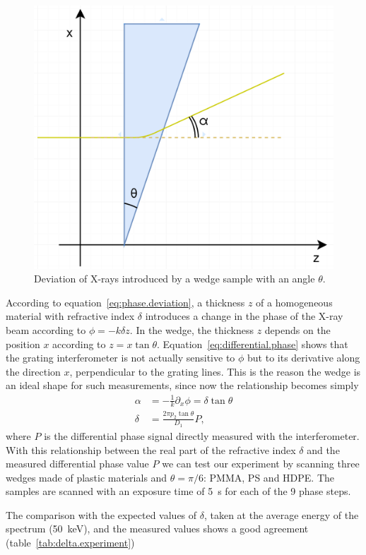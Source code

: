 \begin{figure}[htb]
    \centering
    \includegraphics[width=.5\textwidth]{gfx/wedge-deviation.png}
    \caption{Deviation of X-rays introduced by a wedge sample with an angle
    $\theta$.}
    \label{fig:wedge.deviation}
\end{figure}

According to equation~\eqref{eq:phase.deviation}, a thickness $z$ of a
homogeneous material with refractive index $\delta$ introduces a change in
the phase of the X-ray beam according to $\phi = -k\delta z$. In the wedge,
the thickness $z$ depends on the position $x$ according to $z = x\tan
\theta$. Equation~\eqref{eq:differential.phase} shows that the grating
interferometer is not actually sensitive to $\phi$ but to its derivative
along the direction $x$, perpendicular to the grating lines. This is the
reason the wedge is an ideal shape for such measurements, since now the
relationship becomes simply
\begin{align}
    \alpha &= -\frac{1}{k}\partial_x\phi = \delta\tan\theta\\
    \delta &= \frac{2 \pi p_2 \tan \theta}{D_1}P,
    \label{eq:measuring.differential.phase}
\end{align}
where $P$ is the differential phase signal directly measured with the
interferometer. With this relationship between the real part of the
refractive index $\delta$ and the measured differential phase value $P$ we
can test our experiment by scanning three wedges made of plastic materials
and $\theta = \pi/6$: \ac{PMMA}, \ac{PS} and \ac{HDPE}.
The samples are scanned with an exposure time of \SI{5}{\second} for each of
the \num{9} phase steps.                 

The comparison with the expected values of $\delta$, taken at the average
energy of the spectrum (\SI{50}{\kilo\eV}), and the measured values shows a
good agreement (table~\ref{tab:delta.experiment})

